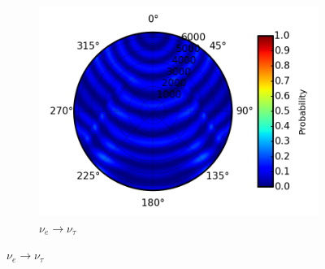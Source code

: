 \documentclass{beamer}
\begin{document}
\begin{frame}
\begin{figure}
\begin{subfigure}[b]{0.33\linewidth}
			\caption{ $\nu_{e} \rightarrow \nu_{\tau}$ }
			\includegraphics[width=\linewidth]{earth_1.0gev_nue2nutau_throughEarth.png}
		\end{subfigure}
	\end{figure}
\end{frame}
\end{document}

